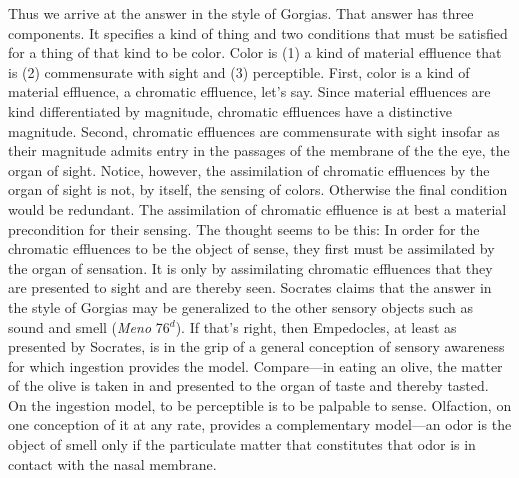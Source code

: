 \documentclass[12pt]{article}
\begin{document}
Thus we arrive at the answer in the style of Gorgias. That answer has three components. It specifies a kind of thing and two conditions that must be satisfied for a thing of that kind to be color. Color is (1) a kind of material effluence that is (2) commensurate with sight and (3) perceptible. First, color is a kind of material effluence, a chromatic effluence, let's say. Since material effluences are kind differentiated by magnitude, chromatic effluences have a distinctive magnitude. Second, chromatic effluences are commensurate with sight insofar as their magnitude admits entry in the passages of the membrane of the the eye, the organ of sight. Notice, however, the assimilation of chromatic effluences by the organ of sight is not, by itself, the sensing of colors. Otherwise the final condition would be redundant. The assimilation of chromatic effluence is at best a material precondition for their sensing. The thought seems to be this: In order for the chromatic effluences to be the object of sense, they first must be assimilated by the organ of sensation. It is only by assimilating chromatic effluences that they are presented to sight and are thereby seen. Socrates claims that the answer in the style of Gorgias may be generalized to the other sensory objects such as sound and smell (\emph{Meno} 76\( ^{d} \)). If that's right, then Empedocles, at least as presented by Socrates, is in the grip of a general conception of sensory awareness for which ingestion provides the model. Compare---in eating an olive, the matter of the olive is taken in and presented to the organ of taste and thereby tasted. On the ingestion model, to be perceptible is to be palpable to sense. Olfaction, on one conception of it at any rate, provides a complementary model---an odor is the object of smell only if the particulate matter that constitutes that odor is in contact with the nasal membrane. 
\end{document}
